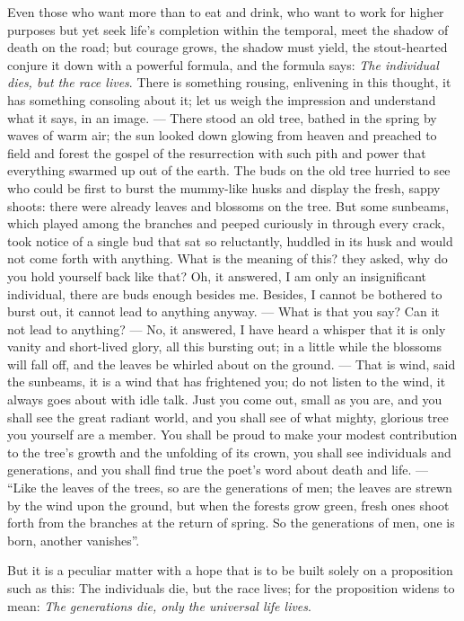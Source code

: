 \documentclass[12pt,a4paper,openany]{book}
\newcommand{\opage}[1]{\marginnote{\footnotesize\textit{[#1]}}}
\begin{document}
Even those who want more than to eat and drink, who want to work for higher purposes but yet
seek life's completion within the temporal, meet the shadow of death on the road; but courage
grows, the shadow must yield, the stout-hearted conjure it down with a powerful formula, and
the formula says: \emph{The individual dies, but the race lives}. There is something rousing,
enlivening in this thought, it has something consoling about it; let us weigh the impression
and understand what it says, in an image. --- There stood an old tree, bathed in the spring by
waves of warm air; the sun looked down glowing from heaven and preached to field and forest the
gospel of the resurrection with such pith and power that everything swarmed up out of the
earth. The buds on the old tree hurried to see who could be first to burst the mummy-like husks
and display the fresh, sappy shoots: there were already leaves and blossoms on the tree. But
some sunbeams, which played among the branches and peeped curiously in through every crack,
took notice of a single bud that sat so reluctantly, huddled in its husk and would not come
forth with anything. What is the meaning of this? they asked, why do you hold yourself back
like that? Oh, it answered, I am only an insignificant individual, there are buds enough
besides me. Besides, I cannot be bothered to burst out, it cannot lead to anything anyway. ---
What is that you say? Can it not lead to anything? --- No, it answered, I have heard a whisper
that it is only vanity and short-lived glory, all this bursting out; in a little while the
blossoms will fall off, and the leaves
\setcounter{footnote}{0}%
\opage{38}be whirled about on the ground. --- That is wind, said the sunbeams, it is a wind that
has frightened you; do not listen to the wind, it always goes about with idle talk. Just you
come out, small as you are, and you shall see the great radiant world, and you shall see of
what mighty, glorious tree you yourself are a member. You shall be proud to make your modest
contribution to the tree's growth and the unfolding of its crown, you shall see individuals and
generations, and you shall find true the poet's word about death and life. --- ``Like the
leaves of the trees, so are the generations of men; the leaves are strewn by the wind upon the
ground, but when the forests grow green, fresh ones shoot forth from the branches at the return
of spring. So the generations of men, one is born, another vanishes''.

But it is a peculiar matter with a hope that is to be built solely on a proposition such as
this: The individuals die, but the race lives; for the proposition widens to mean: \emph{The
generations die, only the universal life lives}.
\end{document}
